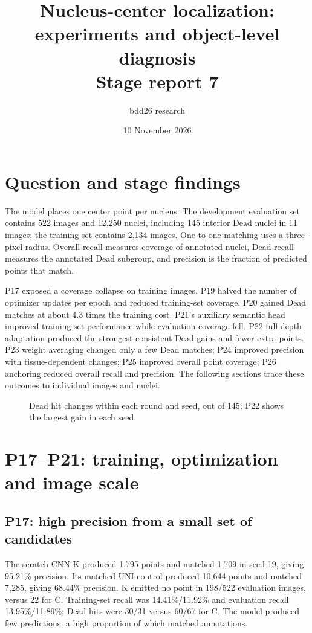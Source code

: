 \documentclass[11pt]{article}
\title{\bfseries Nucleus-center localization: experiments and object-level diagnosis\\\large Stage report 7}\author{bdd26 research}\date{10 November 2026}
\begin{document}
\maketitle\tableofcontents\newpage
\section{Question and stage findings}
The model places one center point per nucleus. The development evaluation set contains 522 images and 12,250 nuclei, including 145 interior Dead nuclei in 11 images; the training set contains 2,134 images. One-to-one matching uses a three-pixel radius. Overall recall measures coverage of annotated nuclei, Dead recall measures the annotated Dead subgroup, and precision is the fraction of predicted points that match.

P17 exposed a coverage collapse on training images. P19 halved the number of optimizer updates per epoch and reduced training-set coverage. P20 gained Dead matches at about 4.3 times the training cost. P21's auxiliary semantic head improved training-set performance while evaluation coverage fell. P22 full-depth adaptation produced the strongest consistent Dead gains and fewer extra points. P23 weight averaging changed only a few Dead matches; P24 improved precision with tissue-dependent changes; P25 improved overall point coverage; P26 anchoring reduced overall recall and precision. The following sections trace these outcomes to individual images and nuclei.
\begin{figure}[H]\centering\caption{Dead hit changes within each round and seed, out of 145; P22 shows the largest gain in each seed.}\end{figure}
\section{P17--P21: training, optimization and image scale}
\subsection{P17: high precision from a small set of candidates}
The scratch CNN K produced 1,795 points and matched 1,709 in seed 19, giving 95.21\% precision. Its matched UNI control produced 10,644 points and matched 7,285, giving 68.44\% precision. K emitted no point in 198/522 evaluation images, versus 22 for C. Training-set recall was 14.41\%/11.92\% and evaluation recall 13.95\%/11.89\%; Dead hits were 30/31 versus 60/67 for C. The model produced few predictions, a high proportion of which matched annotations.
\end{document}
